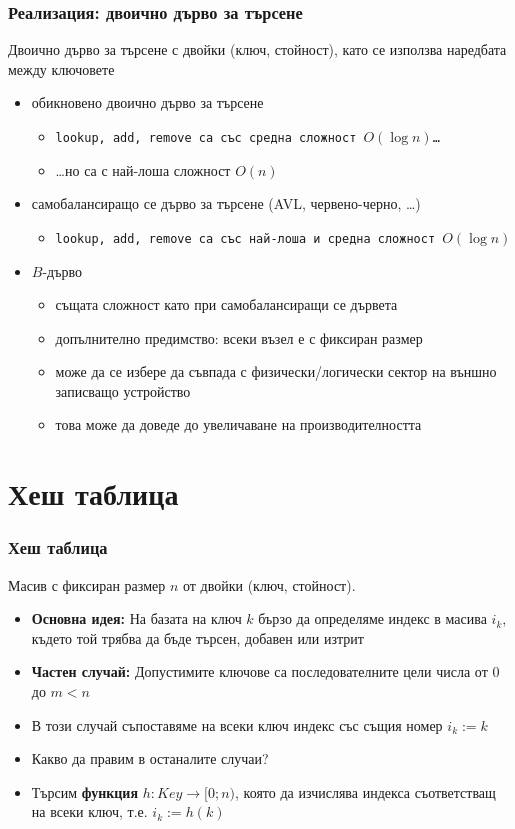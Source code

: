 \documentclass{beamer}
\begin{document}
\begin{frame}
  \frametitle{Реализация: двоично дърво за търсене}
  Двоично дърво за търсене с двойки (ключ, стойност), като се използва наредбата между ключовете
  \pause
  \begin{itemize}
  \item обикновено двоично дърво за търсене
    \begin{itemize}
    \item \tt{lookup}, \tt{add}, \tt{remove} са със средна сложност $O(\log n)$\ldots
    \item \ldots но са с най-лоша сложност $O(n)$
    \end{itemize}
  \item самобалансиращо се дърво за търсене (AVL, червено-черно, \ldots)
    \begin{itemize}
    \item \tt{lookup}, \tt{add}, \tt{remove} са със най-лоша и средна сложност \alert{$O(\log n)$}
    \end{itemize}
  \item $B$-дърво
    \begin{itemize}
    \item същата сложност като при самобалансиращи се дървета
    \item допълнително предимство: всеки възел е с фиксиран размер
    \item може да се избере да съвпада с физически/логически сектор на външно записващо устройство
    \item това може да доведе до увеличаване на производителността
    \end{itemize}
  \end{itemize}
\end{frame}

\section{Хеш таблица}

\begin{frame}
  \frametitle{Хеш таблица}
  Масив с фиксиран размер $n$ от двойки (ключ, стойност).
  \begin{itemize}[<+->]
  \item \textbf{Основна идея:} На базата на ключ $k$ бързо да определяме индекс в масива $i_k$, където той трябва да бъде търсен, добавен или изтрит
  \item \textbf{Частен случай:} Допустимите ключове са последователните цели числа от 0 до $m < n$
  \item В този случай съпоставяме на всеки ключ индекс със същия номер $i_k := k$
  \item Какво да правим в останалите случаи?
  \item Търсим \textbf{функция} $h : Key \rightarrow [0; n)$, която да изчислява индекса съответстващ на всеки ключ, т.е. $i_k := h(k)$
  \end{itemize}
\end{frame}
\end{document}
